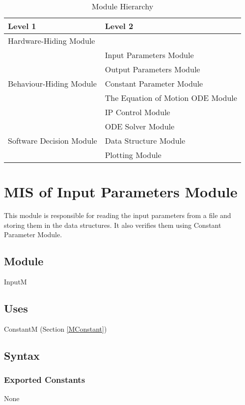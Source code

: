 \documentclass[12pt, titlepage]{article}
\begin{document}
\begin{table}[h!]
\centering
\begin{tabular}{p{} p{}}
\toprule
\textbf{Level 1} & \textbf{Level 2}\\
\midrule

{Hardware-Hiding Module} & ~ \\
\midrule

\multirow{5}{0.3\textwidth}{Behaviour-Hiding Module} & Input Parameters Module\\
& Output Parameters Module\\
& Constant Parameter Module\\
&The Equation of Motion ODE Module\\
& IP Control Module\\
\midrule

\multirow{3}{0.3\textwidth}{Software Decision Module} & {ODE Solver Module}\\
& Data Structure Module\\
& Plotting Module\\
\bottomrule

\end{tabular}
\caption{Module Hierarchy}
\label{TblMH}
\end{table}

\newpage


\section{ MIS of Input Parameters Module \label{MInput} }
This module is responsible for reading the input parameters from a file and storing them in the data structures. It also verifies them using Constant Parameter Module.

\subsection{Module}
InputM

\subsection{Uses}
ConstantM (Section \ref{MConstant})

\subsection{Syntax}



\subsubsection{Exported Constants}
None
\end{document}
